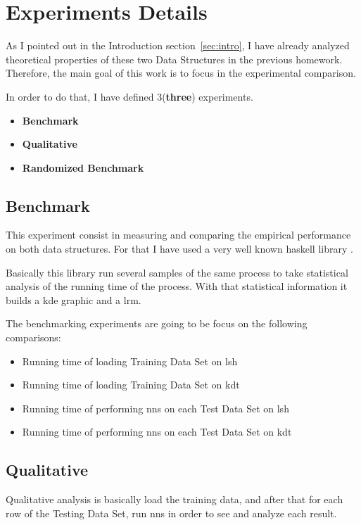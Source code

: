 \documentclass[12pt, a4paper]{article}
\begin{document}
\section{Experiments Details}
As I pointed out in the Introduction section~\ref{sec:intro}, I have already analyzed theoretical properties of these two Data Structures in the previous homework. Therefore, the main goal of this work is to focus in the experimental comparison.

In order to do that, I have defined 3(\textbf{three}) experiments.

\begin{itemize}
  \item \textbf{Benchmark}
  \item \textbf{Qualitative}
  \item \textbf{Randomized Benchmark}
\end{itemize}

\subsection{Benchmark}\label{sub:sec:bench}
This experiment consist in measuring and comparing the empirical performance on both data structures. For that I have used a very well known \acrshort{haskell} library \cite{criterion}.

Basically this library run several samples of the same process to take statistical analysis of the running time of the process. With that statistical information it builds a \acrfull{kde} graphic and a \acrfull{lrm}.

The benchmarking experiments are going to be focus on the following comparisons:

\begin{itemize}
  \item Running time of loading Training Data Set on \acrshort{lsh}
  \item Running time of loading Training Data Set on \acrshort{kdt}
  \item Running time of performing \acrshort{nns} on each Test Data Set on \acrshort{lsh}
  \item Running time of performing \acrshort{nns} on each Test Data Set on \acrshort{kdt}
\end{itemize}

\subsection{Qualitative}
Qualitative analysis is basically load the training data, and after that for each row of the Testing Data Set, run \acrshort{nns} in order to see and analyze each result.
\end{document}

